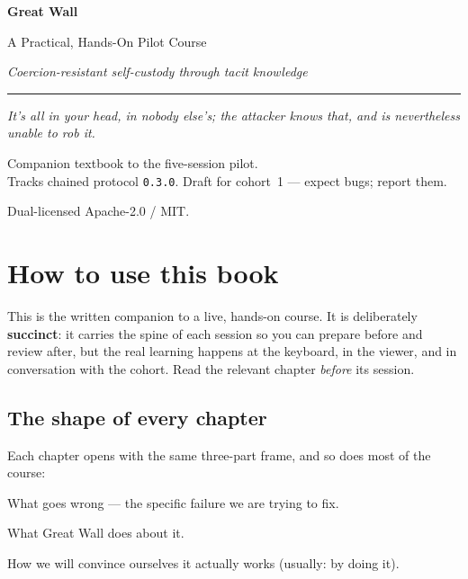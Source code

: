 \documentclass[a4paper,11pt]{report}
\newcommand{\probsoln}[3]{%
  \begin{description}[leftmargin=0pt,labelsep=0.5em,style=nextline]
    \item[\textcolor{attackcol}{Problem.}] #1
    \item[\textcolor{accent}{Solution.}] #2
    \item[\textcolor{modelcol}{Methodology.}] #3
  \end{description}}
\begin{document}
\begin{titlepage}
\centering
\vspace*{2cm}
{\fontsize{40}{46}\selectfont\bfseries\color{accent}Great Wall\par}
\vspace{6pt}
{\Large\color{darktext}A Practical, Hands-On Pilot Course\par}
\vspace{4pt}
{\large\itshape\color{graytext}Coercion-resistant self-custody through tacit knowledge\par}
\vspace{1.4cm}
{\color{accent}\rule{90mm}{1pt}\par}
\vspace{1.4cm}
\begin{minipage}{0.82\textwidth}\centering\small\color{graytext}
\itshape It's all in your head, in nobody else's; the attacker knows that, and
is nevertheless unable to rob it.
\end{minipage}
\vfill
{\small\color{graytext}Companion textbook to the five-session pilot.\\
Tracks chained protocol \texttt{0.3.0}. Draft for cohort~1 — expect bugs;
report them.\par}
\vspace{8pt}
{\small\color{graytext}Dual-licensed Apache-2.0 / MIT.\par}
\end{titlepage}

\chapter*{How to use this book}
\markboth{}{}

This is the written companion to a live, hands-on course. It is deliberately
\textbf{succinct}: it carries the spine of each session so you can prepare
before and review after, but the real learning happens at the keyboard, in the
viewer, and in conversation with the cohort. Read the relevant chapter
\emph{before} its session.

\section*{The shape of every chapter}
Each chapter opens with the same three-part frame, and so does most of the
course:
\probsoln{What goes wrong — the specific failure we are trying to fix.}
{What Great Wall does about it.}
{How we will convince ourselves it actually works (usually: by doing it).}
\end{document}
